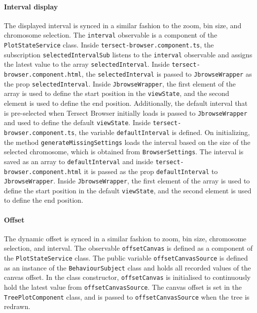 \documentclass[12pt]{article}
\begin{document}
\paragraph{Interval display}
The displayed interval is synced in a similar fashion to the zoom, bin size, and chromosome selection. The \verb +interval+ observable is a component of the \verb +PlotStateService+ class. Inside \verb +tersect-browser.component.ts+, the subscription \verb +selectedIntervalSub+ listens to the \verb +interval+ observable and assigns the latest value to the array \verb +selectedInterval+. Inside \verb +tersect-browser.component.html+, the \verb +selectedInterval+ is passed to \verb +JbrowseWrapper+ as the prop \verb +selectedInterval+. Inside \verb +JbrowseWrapper+, the first element of the array is used to define the start position in the \verb +viewState+, and the second element is used to define the end position. 
Additionally, the default interval that is pre-selected when Tersect Browser initially loads is passed to \verb +JbrowseWrapper+ and used to define the default \verb +viewState+. Inside \verb +tersect-browser.component.ts+, the variable \verb +defaultInterval+ is defined. On initializing, the method \verb +generateMissingSettings+ loads the interval based on the size of the selected chromosome, which is obtained from \verb +BrowserSettings+. The interval is saved as an array to \verb +defaultInterval+ and inside \verb +tersect-browser.component.html+ it is passed as the prop \verb +defaultInterval+ to \verb +JbrowseWrapper+. Inside \verb +JbrowseWrapper+, the first element of the array is used to define the start position in the default \verb +viewState+, and the second element is used to define the end position. 

\paragraph{Offset}
The dynamic offset is synced in a similar fashion to zoom, bin size, chromosome selection, and interval. The observable \verb +offsetCanvas+ is defined as a component of the \verb +PlotStateService+ class. The public variable \verb +offsetCanvasSource+ is defined as an instance of the \verb +BehaviourSubject+ class and holds all recorded values of the canvas offset. In the class constructor, \verb +offsetCanvas+ is initialised to continuously hold the latest value from \verb +offsetCanvasSource+. The canvas offset is set in the \verb +TreePlotComponent+ class, and is passed to \verb +offsetCanvasSource+ when the tree is redrawn. 
\end{document}
